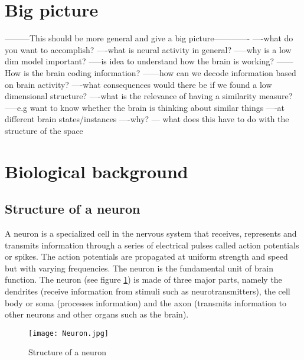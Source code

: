 \section{Big picture}


---------This should be more general and give a big picture-------------
----what do you want to accomplish?
----what is neural activity in general?
-----why is a low dim model important?
-----is idea to understand how the brain is working?
------How is the brain coding information?
------how can we decode information based on brain activity?
----what consequences would there be if we found a low dimensional structure?
----what is the relevance of having a similarity measure?
-----e.g want to know whether the brain is thinking about similar things 
----at different brain states/instances
----why?  --- what does this have to do with the structure of the space



\section{Biological background}
\subsection{Structure of a neuron}
A neuron is a specialized cell in the nervous system that receives, represents and transmits information through a series of electrical pulses called action potentials or spikes. The action potentials are propagated at uniform strength and speed but with varying frequencies. The neuron is the fundamental unit of brain function. The neuron (see  figure \ref{fig:Neuron}) is made of three major parts, namely the dendrites (receive information from stimuli such as neurotransmitters), the cell body or soma (processes information) and the axon (transmits information to other neurons and other organs such as the brain).

\begin{figure}[h]
\caption{Structure of  a neuron}
\texttt{[image: Neuron.jpg]}
      \label{fig:Neuron}
\end{figure}


